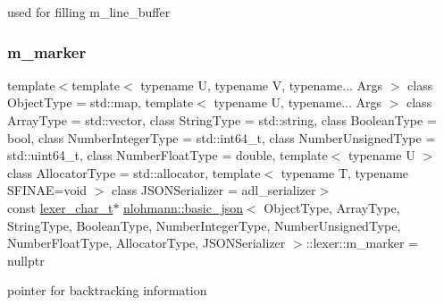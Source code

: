 used for filling m\+\_\+line\+\_\+buffer 

\mbox{\label{classnlohmann_1_1basic__json_1_1lexer_a1a9ad4e31a33a32943f1c102f1fa7d59}} 
\subsubsection{\texorpdfstring{m\+\_\+marker}{m\_marker}}
{\footnotesize\ttfamily template$<$template$<$ typename U, typename V, typename... Args $>$ class Object\+Type = std\+::map, template$<$ typename U, typename... Args $>$ class Array\+Type = std\+::vector, class String\+Type  = std\+::string, class Boolean\+Type  = bool, class Number\+Integer\+Type  = std\+::int64\+\_\+t, class Number\+Unsigned\+Type  = std\+::uint64\+\_\+t, class Number\+Float\+Type  = double, template$<$ typename U $>$ class Allocator\+Type = std\+::allocator, template$<$ typename T, typename S\+F\+I\+N\+A\+E=void $>$ class J\+S\+O\+N\+Serializer = adl\+\_\+serializer$>$ \\
const \hyperlink{classnlohmann_1_1basic__json_1_1lexer_abe04be04d0575249f8806c334bacbc80}{lexer\+\_\+char\+\_\+t}$\ast$ \hyperlink{classnlohmann_1_1basic__json}{nlohmann\+::basic\+\_\+json}$<$ Object\+Type, Array\+Type, String\+Type, Boolean\+Type, Number\+Integer\+Type, Number\+Unsigned\+Type, Number\+Float\+Type, Allocator\+Type, J\+S\+O\+N\+Serializer $>$\+::lexer\+::m\+\_\+marker = nullptr\hspace{0.3cm}{\ttfamily [private]}}



pointer for backtracking information 

\mbox{\label{classnlohmann_1_1basic__json_1_1lexer_ace4ad69e8cd3f4686260b6e504f6a37e}} 
